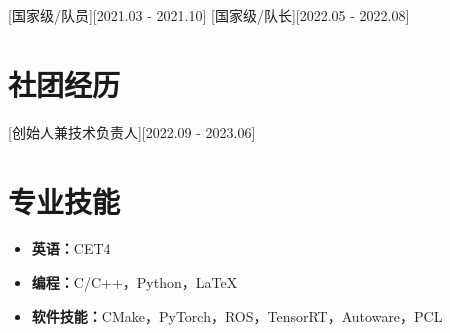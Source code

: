 \documentclass{resume}
\begin{document}
[国家级/队员][2021.03 - 2021.10] 
[国家级/队长][2022.05 - 2022.08] 


\section{社团经历}
[创始人兼技术负责人][2022.09 - 2023.06]


\section{专业技能}
\begin{itemize}
    \item \textbf{英语：}CET4
    \item \textbf{编程：}C/C++，Python，LaTeX
    \item \textbf{软件技能：}CMake，PyTorch，ROS，TensorRT，Autoware，PCL
\end{itemize}
\end{document}
